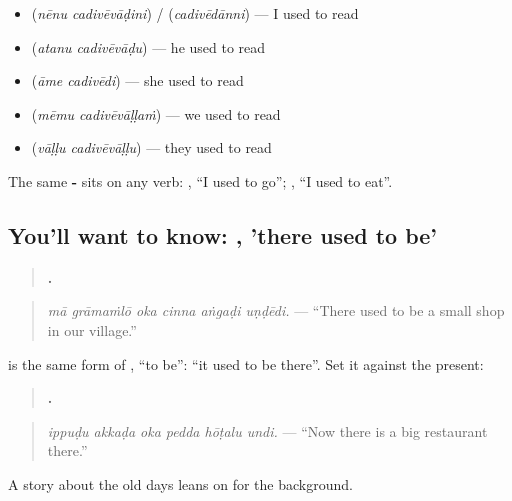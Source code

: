 \begin{itemize}
\raggedright
  \item \textbf{ } (\emph{nēnu cadivēvāḍini}) / \textbf{} (\emph{cadivēdānni}) — I used to read
  \item \textbf{ } (\emph{atanu cadivēvāḍu}) — he used to read
  \item \textbf{ } (\emph{āme cadivēdi}) — she used to read
  \item \textbf{ } (\emph{mēmu cadivēvāḷḷaṁ}) — we used to read
  \item \textbf{ } (\emph{vāḷḷu cadivēvāḷḷu}) — they used to read
\end{itemize}

The same \textbf{-} sits on any verb: \textbf{}, \textquotedblleft{}I used to go\textquotedblright{}; \textbf{}, \textquotedblleft{}I used to eat\textquotedblright{}.

\subsection*{You'll want to know: , 'there used to be'}
\begin{quote}
\textbf{     .}
\end{quote}

\begin{quote}
\emph{mā grāmaṁlō oka cinna aṅgaḍi uṇḍēdi.} — \textquotedblleft{}There used to be a small shop in our village.\textquotedblright{}
\end{quote}

\textbf{} is the same form of \textbf{}, \textquotedblleft{}to be\textquotedblright{}: \textquotedblleft{}it used to be there\textquotedblright{}. Set it against the present:

\begin{quote}
\textbf{     .}
\end{quote}

\begin{quote}
\emph{ippuḍu akkaḍa oka pedda hōṭalu undi.} — \textquotedblleft{}Now there is a big restaurant there.\textquotedblright{}
\end{quote}

A story about the old days leans on \textbf{} for the background.

